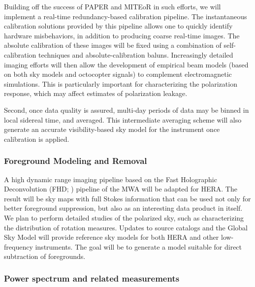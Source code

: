 \documentclass[preprint]{aastex}
\begin{document}
Building off the success of PAPER and MITEoR in such efforts, we will implement a real-time redundancy-based calibration pipeline.  The instantaneous calibration solutions provided by this pipeline allows one to quickly identify hardware misbehaviors, in addition to producing coarse real-time images.  The absolute calibration of these images will be fixed using a combination of self-calibration techniques and absolute-calibration baluns.  Increasingly detailed imaging efforts will then allow the development of empirical beam models (based on both sky models and octocopter signals) to complement electromagnetic simulations.  This is particularly important for characterizing the polarization response, which may affect estimates of polarization leakage.

Second, once data quality is assured, multi-day periods of data may be
binned in local sidereal time, and averaged. This intermediate
averaging scheme will also generate an accurate visibility-based sky
model for the instrument once calibration is applied.

\subsubsection{Foreground Modeling and Removal}
\label{sec:DataProducts}

A high dynamic range imaging pipeline based on the Fast Holographic Deconvolution (FHD; \citealt{sullivan_et_al2012}) pipeline of the MWA will be adapted for HERA.  The result will be sky maps with full Stokes information that can be used not only for better foreground suppression, but also as an interesting data product in itself.  We plan to perform detailed studies of the polarized sky, such as characterizing the distribution of rotation measures.  Updates to source catalogs and the Global Sky Model \citep{deoliveira2008} will provide reference sky models for both HERA and other low-frequency instruments. The goal will be to generate a model suitable for direct subtraction of foregrounds. 


\subsubsection{Power spectrum and related measurements}
\end{document}
